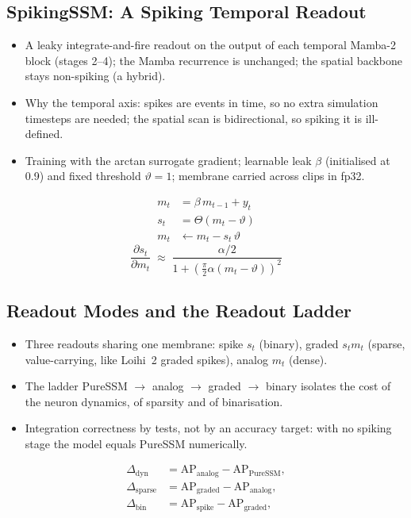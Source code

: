 \documentclass[11pt, a4paper]{report}
\begin{document}
\subsection{SpikingSSM: A Spiking Temporal Readout}
\label{subsec:spiking_method}
\begin{itemize}
  \item A leaky integrate-and-fire readout on the output of each temporal Mamba-2 block (stages 2--4); the Mamba recurrence is unchanged; the spatial backbone stays non-spiking (a hybrid).
  \item Why the temporal axis: spikes are events in time, so no extra simulation timesteps are needed; the spatial scan is bidirectional, so spiking it is ill-defined.
  \item Training with the arctan surrogate gradient; learnable leak $\beta$ (initialised at 0.9) and fixed threshold $\vartheta = 1$; membrane carried across clips in fp32.
\end{itemize}
\begin{align}
  m_t &= \beta\, m_{t-1} + y_t \label{eq:lif_integrate}\\
  s_t &= \Theta(m_t - \vartheta) \label{eq:lif_fire}\\
  m_t &\leftarrow m_t - s_t\,\vartheta \label{eq:lif_reset}
\end{align}
\begin{equation}
  \frac{\partial s_t}{\partial m_t} \;\approx\; \frac{\alpha/2}{1 + \left(\tfrac{\pi}{2}\alpha (m_t-\vartheta)\right)^2}
  \label{eq:surrogate}
\end{equation}

\subsection{Readout Modes and the Readout Ladder}
\label{subsec:readout_modes}
\begin{itemize}
  \item Three readouts sharing one membrane: spike $s_t$ (binary), graded $s_t m_t$ (sparse, value-carrying, like Loihi~2 graded spikes), analog $m_t$ (dense).
  \item The ladder PureSSM $\rightarrow$ analog $\rightarrow$ graded $\rightarrow$ binary isolates the cost of the neuron dynamics, of sparsity and of binarisation.
  \item Integration correctness by tests, not by an accuracy target: with no spiking stage the model equals PureSSM numerically.
\end{itemize}
\begin{equation}
\begin{aligned}
  \Delta_{\mathrm{dyn}} &= \mathrm{AP}_{\mathrm{analog}} - \mathrm{AP}_{\mathrm{PureSSM}},\\
  \Delta_{\mathrm{sparse}} &= \mathrm{AP}_{\mathrm{graded}} - \mathrm{AP}_{\mathrm{analog}},\\
  \Delta_{\mathrm{bin}} &= \mathrm{AP}_{\mathrm{spike}} - \mathrm{AP}_{\mathrm{graded}},
\end{aligned}
  \label{eq:ladder}
\end{equation}
\end{document}
